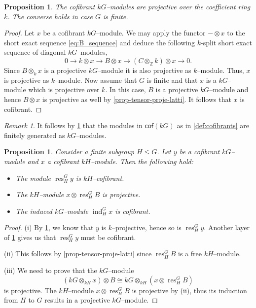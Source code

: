 \documentclass{amsart}
\newcommand{\res}{\operatorname{res}\nolimits}
\newcommand{\ind}{\operatorname{ind}\nolimits}
\numberwithin{equation}{section}%
\newtheorem{proposition}[equation]{Proposition}
\theoremstyle{remark}
\newtheorem{remark}[equation]{Remark}
\begin{document}
\begin{proposition}
\label{prop:cof_proj}
The cofibrant $kG$--modules are projective over the coefficient ring $k$. The converse holds in case $G$ is finite. 
\end{proposition}

\begin{proof}
Let $x$ be a cofibrant $kG$--module. We may apply the functor $-\otimes x$ to the short exact sequence \eqref{eq:B_sequence} and deduce the following $k$-split short exact sequence of diagonal $kG$--modules,
\begin{equation}
\label{eq:B_sequence2}
0\rightarrow k\otimes x \rightarrow B\otimes x \rightarrow (C\otimes_{\mathbb{Z}}k)\otimes x\rightarrow 0. \nonumber
\end{equation}
Since $B\otimes_kx$ is a projective $kG$--module it is also projective as $k$--module. 
Thus, $x$ is projective as $k$--module. Now assume that $G$ is finite and that $x$ is a $kG$--module which is projective over $k$. In this case, $B$ is a projective $kG$--module and hence $B\otimes x$ is projective as well by \cref{prop-tensor-proje-latti}.  It follows that $x$ is cofibrant.
\end{proof}

\begin{remark}
\label{rem:cof_fg}
It follows by  \cref{prop:cof_proj} that the modules in $\mathsf{cof}(kG)$ as in  \cref{def:cofibrants} are finitely generated as $kG$--modules. 
\end{remark}



\begin{proposition}
\label{prop:cof_ind_kes}
Consider a finite subgroup $H\leqslant G$. Let $y$ be a cofibrant $kG$--module and $x$ a cofibrant $kH$--module. Then the following hold:
\begin{itemize}
\item[(i)] The module $\res^G_H y$ is $kH$--cofibrant. 
\item[(ii)] The $kH$--module $x\otimes \res^G_HB$ is projective.
\item[(iii)] The induced $kG$--module $\ind^G_H x$ is  cofibrant.
\end{itemize}
\end{proposition}

\begin{proof}
(i) By  \cref{prop:cof_proj}, we know that $y$ is $k$--projective, hence so is $\res^G_Hy$. Another layer of  \cref{prop:cof_proj} gives us that $\res^G_H y$ must be cofibrant. 

(ii) This follows by  \cref{prop-tensor-proje-latti} since $\res^G_HB$ is a free $kH$--module. 

(iii) We need to prove that the $kG$--module 
\[
(kG\otimes_{kH}x) \otimes B \cong kG\otimes_{kH} (x\otimes \res^G_H B )
\]
is projective. The $kH$--module $x\otimes \res^G_H B$ is projective by (ii), thus its induction from $H$ to $G$ results in a projective $kG$--module.
\end{proof}
\end{document}
